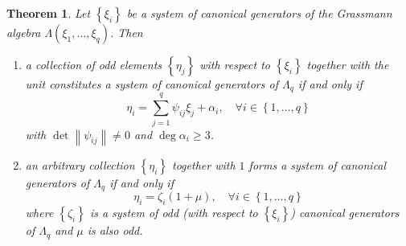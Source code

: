 \documentclass{article}
\newtheorem{theorem}{Theorem}
\theoremstyle{definition}
\begin{document}
\begin{theorem}
    \label{thm:grassmann_canonical_generators}
    Let $\left\{ \xi_i \right\}$ be a system of canonical generators of the Grassmann algebra $\Lambda(\xi_1, \dots, \xi_q)$. Then
    \begin{enumerate}
        \item a collection of odd elements $\left\{ \eta_j \right\}$ with respect to $\left\{ \xi_i \right\}$ together with the unit constitutes a system of canonical generators of $\Lambda_q$ if and only if
        \begin{equation*}
            \eta_i = \sum_{j = 1}^q \psi_{ij} \xi_j + \alpha_i, \quad \forall i \in \left\{ 1, \dots, q \right\}
        \end{equation*}
        with $\det \left\| \psi_{ij} \right\| \neq 0$ and $\deg \alpha_i \geq 3$.
        \item an arbitrary collection $\left\{ \eta_i \right\}$ together with $1$ forms a system of canonical generators of $\Lambda_q$ if and only if
        \begin{equation}
            \label{eq:canonical_generators}
            \eta_i = \zeta_i(1 + \mu), \quad \forall i \in \left\{ 1, \dots, q \right\}
        \end{equation}
        where $\left\{ \zeta_i \right\}$ is a system of odd (with respect to $\left\{ \xi_i \right\}$) canonical generators of $\Lambda_q$ and $\mu$ is also odd.
    \end{enumerate}
\end{theorem}
\end{document}
